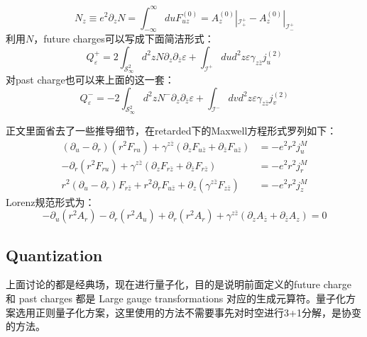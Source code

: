 \begin{equation}
	N_z\equiv e^2\partial_zN=\int_{-\infty}^{\infty}duF_{uz}^{(0)}=A_{z}^{(0)}|_{\mathcal{I}_{+}^{+}}-A_{z}^{(0)}|_{\mathcal{I}_{-}^{+}}
\end{equation}
利用$N$，future charges可以写成下面简洁形式：
\begin{equation}\label{eq:23.21}
	Q_{\varepsilon}^{+}=2\int_{\mathcal{S}_\infty^2} d^{2}zN\partial_{z}\partial_{\bar{z}}\varepsilon+\int_{\mathcal I^{+}}dud^{2}z\varepsilon\gamma_{z\bar{z}}j_{u}^{(2)}
\end{equation}
对past charge也可以来上面的这一套：
\begin{equation}\label{eq:23.21.2}
	Q_{\varepsilon}^{-}=-2\int_{\mathcal{S}_\infty^2} d^{2}zN^-\partial_{z}\partial_{\bar{z}}\varepsilon+\int_{\mathcal I^{-}}dvd^{2}z\varepsilon\gamma_{z\bar{z}}j_{v}^{(2)}
\end{equation}
\begin{remark}
	正文里面省去了一些推导细节，在retarded下的Maxwell方程形式罗列如下：
	\begin{equation}
		\begin{aligned}(\partial_u-\partial_r)\left(r^2F_{ru}\right)+\gamma^{z\bar{z}}\left(\partial_zF_{u\bar{z}}+\partial_{\bar{z}}F_{u\bar{z}}\right)&=-e^2r^2j^M_u\\-\partial_r\left(r^2F_{ru}\right)+\gamma^{z\bar{z}}\left(\partial_zF_{r\bar{z}}+\partial_{\bar{z}}F_{r\bar{z}}\right)&=-e^2r^2j^M_r\\r^2\left(\partial_u-\partial_r\right)F_{r\bar{z}}+r^2\partial_rF_{u\bar{z}}+\partial_z\left(\gamma^{z\bar{z}}F_{z\bar{z}}\right)&=-e^2r^2j^M_z\end{aligned}
	\end{equation}
	Lorenz规范形式为：
	\begin{equation}
		-\partial_u\left(r^2A_r\right)-\partial_r\left(r^2A_u\right)+\partial_r\left(r^2A_r\right)+\gamma^{z\bar{z}}\left(\partial_zA_{\bar{z}}+\partial_{\bar{z}}A_z\right)=0
	\end{equation}
\end{remark}
\subsection{Quantization}
上面讨论的都是经典场，现在进行量子化，目的是说明前面定义的future charge 和 past charges 都是 Large gauge transformations 对应的生成元算符。量子化方案选用正则量子化方案，这里使用的方法不需要事先对时空进行3+1分解，是协变的方法\cite{Ashtekar1987AsymptoticQ,Frolov:1979ab,1989thyg.book.....H,Lee:1990nz,Wald:1999wa}。

